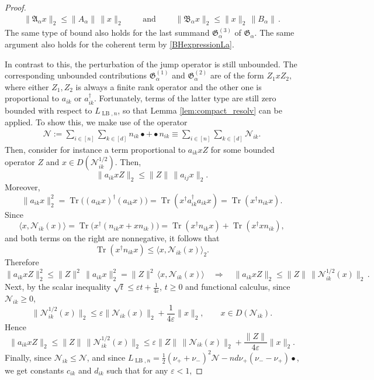 \documentclass[11pt]{amsart}
\let\epsilon=\varepsilon %
\newcommand{\1}{\mathbbm{1}}
\renewcommand{\epsilon}{\varepsilon}
\theoremstyle{plain}
\theoremstyle{definition}
\theoremstyle{remark}
\numberwithin{equation}{section}
\begin{document}
\begin{proof}
\begin{align*}
\|\mathfrak{A}_\alpha x\|_2\le \|A_\alpha\|\,\|x\|_2\qquad \text{ and }\qquad \|\mathfrak{B}_\alpha x\|_2\le \|x\|_2\,\|B_\alpha\|\,.
\end{align*}
The same type of bound also holds for the last summand $\mathfrak{G}_\alpha^{(3)}$ of $\mathfrak{G}_\alpha$. The same argument also holds for the coherent term by \eqref{BHexpressionLa}.

In contrast to this, the perturbation of the jump operator is still unbounded. The corresponding unbounded contributions $\mathfrak{G}_\alpha^{(1)}$ and $\mathfrak{G}_\alpha^{(2)}$ are of the form $Z_1xZ_2,$ where either $Z_1,Z_2$ is always a finite rank operator and the other one is proportional to $a_{ik}$ or $a_{ik}^{\dagger}$. Fortunately, terms of the latter type are still zero bounded with respect to $L_{\operatorname{LB},n}$, so that Lemma \ref{lem:compact_resolv} can be applied. To show this, we make use of the operator 
\begin{align*}
\mathcal{N}:=\sum_{i\in[n]}\sum_{k\in[d]} n_{ik} \bullet + \bullet n_{ik}\equiv \sum_{i\in[n]}\sum_{k\in[d]}\mathcal{N}_{ik}.
\end{align*}
Then, consider for instance a term proportional to $a_{ik}x Z$ for some bounded operator $Z$ and $x\in D(\mathcal{N}_{ik}^{1/2})$. Then, 
\[
\|a_{ik}xZ\|_{2}\le \|Z\|\,\|a_{ij}x\|_{2}.
\]
Moreover,
\[
\|a_{ik}x\|_{2}^2
=\operatorname{Tr}\bigl((a_{ik}x)^\dagger(a_{ik}x)\bigr)
=\operatorname{Tr}(x^\dagger a_{ik}^\dagger a_{ik} x)
=\operatorname{Tr}(x^\dagger n_{ik} x).
\]
Since
\[
\langle x,\mathcal N_{ik} (x)\rangle
=\operatorname{Tr}\bigl(x^\dagger (n_{ik}x+xn_{ik})\bigr)
=\operatorname{Tr}(x^\dagger n_{ik}x)+\operatorname{Tr}(x^\dagger xn_{ik}),
\]
and both terms on the right are nonnegative, it follows that
\[
\operatorname{Tr}(x^\dagger n_{ik}x)\le \langle x,\mathcal N_{ik}(x)\rangle_{2}.
\]
Therefore
\[
\|a_{ik}xZ\|_{2}^2
\le \|Z\|^2\,\|a_{ik}x\|_{2}^2
=\|Z\|^2\,\langle x,\mathcal{N}_{ik}(x)\rangle
 \quad \Longrightarrow \quad \|a_{ik}xZ\|_2\le \|Z\|\,\|\mathcal{N}_{ik}^{1/2}(x)\|_2\,.
\]
Next, by the scalar inequality $\sqrt t\le \varepsilon t+\frac1{4\varepsilon}$, $t\ge0$ and functional calculus, since $\mathcal{N}_{ik}\ge 0$,
\[
\|\mathcal N_{ik}^{1/2}(x)\|_{2}\le \varepsilon \|\mathcal N_{ik} (x)\|_{2}+\frac1{4\varepsilon}\|x\|_{2},
\qquad x\in D(\mathcal N_{ik}).
\]
Hence
\[
\|a_{ik}xZ\|_{2}
\le \|Z\|\,\|\mathcal N_{ik}^{1/2}(x)\|_{2}
\le \varepsilon \|Z\|\,\|\mathcal N_{ik} (x)\|_{2}+\frac{\|Z\|}{4\varepsilon}\|x\|_{2}.
\]
Finally, since $\mathcal{N}_{ik}\le \mathcal{N}$, and since $L_{\operatorname{LB},n}= \frac{1}{2}(\nu_++\nu_-)^2\mathcal{N}-nd\nu_+(\nu_--\nu_+)\bullet $, we get constants $c_{ik}$ and $d_{ik}$ such that for any $\epsilon<1$,

\end{proof}
\end{document}
